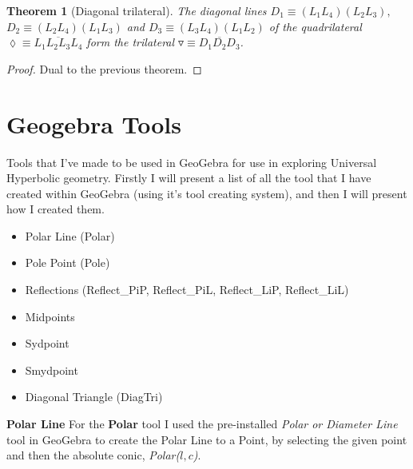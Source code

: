 \documentclass[11pt]{article}
\newtheorem{theorem}{Theorem}
\begin{document}
\begin{theorem}[Diagonal trilateral]
The diagonal lines $D_{1}\equiv(L_{1}L_{4})(L_{2}L_{3}),$\newline
$D_{2}\equiv(L_{2}L_{4})(L_{1}L_{3})$ and $D_{3}%
\equiv(L_{3}L_{4})(L_{1}L_{2})$ of the quadrilateral $\lozenge\equiv%
\overline{L_{1}L_{2}L_{3}L_{4}}$ form the trilateral $\triangledown\equiv%
\overline{D_{1}D_{2}D_{3}}$.
\end{theorem}

\begin{proof}
Dual to the previous theorem.
\end{proof}

\pagebreak

\section{\protect\bigskip Geogebra Tools}

Tools that I've made to be used in GeoGebra for use in exploring Universal
Hyperbolic geometry. Firstly I will present a list of all the tool that I
have created within GeoGebra (using it's tool creating system), and then I
will present how I created them.\newline

\begin{itemize}
\item Polar Line (Polar)

\item Pole Point (Pole)

\item Reflections (Reflect\_PiP, Reflect\_PiL, Reflect\_LiP, Reflect\_LiL)

\item Midpoints

\item Sydpoint

\item Smydpoint

\item Diagonal Triangle (DiagTri)
\end{itemize}

\textbf{Polar Line}\newline
For the \textbf{Polar} tool I used the pre-installed \textit{Polar or
Diameter Line} tool in GeoGebra to create the Polar Line to a Point, by
selecting the given point and then the absolute conic, \textit{Polar($l,c$)}.%
\newline
{} %
\end{document}
